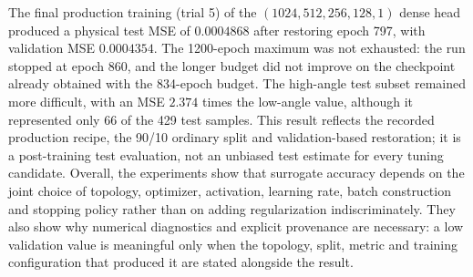 The final production training (trial 5) of the $(1024,512,256,128,1)$ dense head produced a physical test MSE of $0.0004868$ after restoring epoch 797, with validation MSE $0.0004354$. The 1200-epoch maximum was not exhausted: the run stopped at epoch 860, and the longer budget did not improve on the checkpoint already obtained with the 834-epoch budget. The high-angle test subset remained more difficult, with an MSE $2.374$ times the low-angle value, although it represented only 66 of the 429 test samples. This result reflects the recorded production recipe, the 90/10 ordinary split and validation-based restoration; it is a post-training test evaluation, not an unbiased test estimate for every tuning candidate. Overall, the experiments show that surrogate accuracy depends on the joint choice of topology, optimizer, activation, learning rate, batch construction and stopping policy rather than on adding regularization indiscriminately. They also show why numerical diagnostics and explicit provenance are necessary: a low validation value is meaningful only when the topology, split, metric and training configuration that produced it are stated alongside the result.
